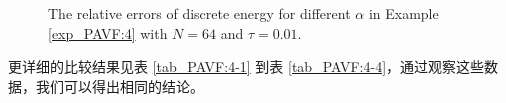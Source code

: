 \begin{figure}[H]
\begin{center}
  \caption{The relative errors of discrete energy for different $\alpha$ in Example \ref{exp_PAVF:4} with $N = 64$ and $\tau=0.01$.} \label{fig_PAVF:12}
\end{center}
\end{figure}

更详细的比较结果见表 \ref{tab_PAVF:4-1} 到表 \ref{tab_PAVF:4-4}，通过观察这些数据，我们可以得出相同的结论。


